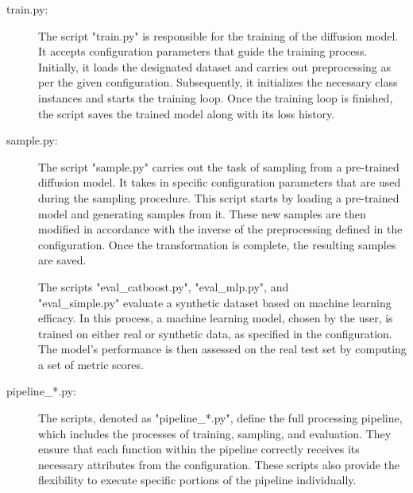 \begin{description}
	\item[train.py:]
		The script "train.py" is responsible for the training of the diffusion \gls{model}. 
		It accepts configuration parameters that guide the training process. 
		Initially, it loads the designated dataset and carries out preprocessing as per the given configuration. 
		Subsequently, it initializes the necessary class instances and starts the training loop. 
		Once the training loop is finished, the script saves the trained \gls{model} along with its loss history.

	\item[sample.py:]
		The script "sample.py" carries out the task of sampling from a pre-trained diffusion \gls{model}. 
		It takes in specific configuration parameters that are used during the sampling procedure. 
		This script starts by loading a pre-trained \gls{model} and generating samples from it. 
		These new samples are then modified in accordance with the inverse of the preprocessing defined in the configuration.
		Once the transformation is complete, the resulting samples are saved.

	\item[]
		The scripts "eval\_catboost.py", "eval\_mlp.py", and \\"eval\_simple.py" evaluate a synthetic dataset based on machine learning efficacy. 
		In this process, a machine learning \gls{model}, chosen by the user, is trained on either real or synthetic data, as specified in the configuration. 
		The \gls{model}'s performance is then assessed on the real test set by computing a set of metric scores.

	\item[pipeline\_*.py\footnotemark:]
		The scripts, denoted as "pipeline\_*.py", define the full processing pipeline, which includes the processes of training, sampling, and evaluation. 
		They ensure that each function within the pipeline correctly receives its necessary attributes from the configuration. 
		These scripts also provide the flexibility to execute specific portions of the pipeline individually.


\end{description}
